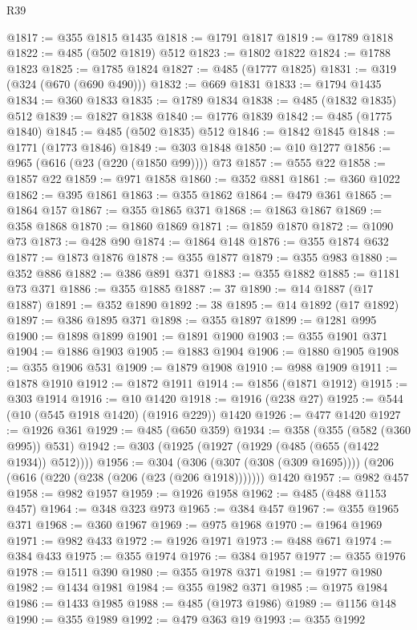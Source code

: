 \begin{lexlean}{R39}
\begin{coremodule}
@1817 := @355 @1815 @1435
@1818 := @1791 @1817
@1819 := @1789 @1818
@1822 := @485 (@502 @1819) @512
@1823 := @1802 @1822
@1824 := @1788 @1823
@1825 := @1785 @1824
@1827 := @485 (@1777 @1825)
@1831 := @319 (@324 (@670 (@690 @490)))
@1832 := @669 @1831
@1833 := @1794 @1435
@1834 := @360 @1833
@1835 := @1789 @1834
@1838 := @485 (@1832 @1835) @512
@1839 := @1827 @1838
@1840 := @1776 @1839
@1842 := @485 (@1775 @1840)
@1845 := @485 (@502 @1835) @512
@1846 := @1842 @1845
@1848 := @1771 (@1773 @1846)
@1849 := @303 @1848
@1850 := @10 @1277
@1856 := @965 (@616 (@23 (@220 (@1850 @99)))) @73
@1857 := @555 @22
@1858 := @1857 @22
@1859 := @971 @1858
@1860 := @352 @881
@1861 := @360 @1022
@1862 := @395 @1861
@1863 := @355 @1862
@1864 := @479 @361
@1865 := @1864 @157
@1867 := @355 @1865 @371
@1868 := @1863 @1867
@1869 := @358 @1868
@1870 := @1860 @1869
@1871 := @1859 @1870
@1872 := @1090 @73
@1873 := @428 @90
@1874 := @1864 @148
@1876 := @355 @1874 @632
@1877 := @1873 @1876
@1878 := @355 @1877
@1879 := @355 @983
@1880 := @352 @886
@1882 := @386 @891 @371
@1883 := @355 @1882
@1885 := @1181 @73 @371
@1886 := @355 @1885
@1887 := 37
@1890 := @14 @1887 (@17 @1887)
@1891 := @352 @1890
@1892 := 38
@1895 := @14 @1892 (@17 @1892)
@1897 := @386 @1895 @371
@1898 := @355 @1897
@1899 := @1281 @995
@1900 := @1898 @1899
@1901 := @1891 @1900
@1903 := @355 @1901 @371
@1904 := @1886 @1903
@1905 := @1883 @1904
@1906 := @1880 @1905
@1908 := @355 @1906 @531
@1909 := @1879 @1908
@1910 := @988 @1909
@1911 := @1878 @1910
@1912 := @1872 @1911
@1914 := @1856 (@1871 @1912)
@1915 := @303 @1914
@1916 := @10 @1420
@1918 := @1916 (@238 @27)
@1925 := @544 (@10 (@545 @1918 @1420) (@1916 @229)) @1420
@1926 := @477 @1420
@1927 := @1926 @361
@1929 := @485 (@650 @359)
@1934 := @358 (@355 (@582 (@360 @995)) @531)
@1942 := @303 (@1925 (@1927 (@1929 (@485 (@655 (@1422 @1934)) @512))))
@1956 := @304
    (@306 (@307 (@308 (@309 @1695))))
    (@206 (@616 (@220 (@238 (@206 (@23 (@206 @1918)))))))
    @1420
@1957 := @982 @457
@1958 := @982 @1957
@1959 := @1926 @1958
@1962 := @485 (@488 @1153 @457)
@1964 := @348 @323 @973
@1965 := @384 @457
@1967 := @355 @1965 @371
@1968 := @360 @1967
@1969 := @975 @1968
@1970 := @1964 @1969
@1971 := @982 @433
@1972 := @1926 @1971
@1973 := @488 @671
@1974 := @384 @433
@1975 := @355 @1974
@1976 := @384 @1957
@1977 := @355 @1976
@1978 := @1511 @390
@1980 := @355 @1978 @371
@1981 := @1977 @1980
@1982 := @1434 @1981
@1984 := @355 @1982 @371
@1985 := @1975 @1984
@1986 := @1433 @1985
@1988 := @485 (@1973 @1986)
@1989 := @1156 @148
@1990 := @355 @1989
@1992 := @479 @363 @19
@1993 := @355 @1992

\end{coremodule}
\end{lexlean}

